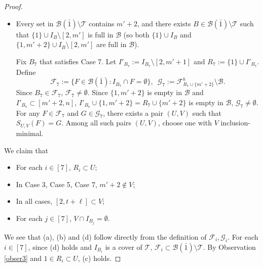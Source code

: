 \documentclass[11pt]{article}
\newcommand{\m}{\mathcal}
\begin{document}
\begin{proof}
\begin{itemize}
Fix $B_6$ that satisfies Case 6. 
Let $I'_{B_6}:=I_{B_6}\setminus [2,m']$ and $R_6:=\{1\}\cup I'_{B_6}$.
Define
\begin{equation*}
    \m F_6:=\{F\in \m B(\bar1): I_{B_6}\cap F=\emptyset\}, \,\,\,
    \m G_6:=\m F_{R_6}^b\setminus \m B.
\end{equation*}
Since $B_6\in \m F_6$, $\m F_6\ne \emptyset$. Since $R_6$ is non-full in $\m B$, $\m G_6\ne \emptyset$. 
For any $F\in \m F_6$ and $G\in \m G_6$, there exists a pair $(U,V)$ such that $S_{U,V}(F)=G$. Among all such pairs $(U,V)$, choose one with $V$ inclusion-minimal.

\item[Case 7.] Every set in $\m B(\bar{1})\setminus \m T$ contains $m'+2$, and there exists $B\in \m B(\bar{1})\setminus \m T$ such that $\{1\}\cup I_{B}\setminus [2,m']$ is full in $\m B$ (so both $\{1\}\cup I_{B}$ and 
$\{1,m'+2\}\cup I_{B}\setminus [2,m']$ are full in $\m B$). 

Fix $B_7$ that satisfies Case 7. 
Let $I'_{B_7}:=I_{B_7}\setminus [2,m'+1]$ and $R_7:=\{1\}\cup I'_{B_7}$.
Define
\begin{equation*}
    \m F_7:=\{F\in \m B(\bar1): I_{B_7}\cap F=\emptyset\}, \,\,\,
    \m G_7:=\m F_{R_7\cup \{m'+2\}}^b\setminus \m B.
\end{equation*}
Since $B_7\in \m F_7$, $\m F_7\ne \emptyset$. 
Since $\{1,m'+2\}$ is empty in $\m B$ and $I'_{B_7}\subset [m'+2, n]$, $I'_{B_7}\cup \{1, m'+2\}=R_7\cup \{m'+2\}$ is empty in $\m B$, $\m G_7\ne \emptyset$. 
For any $F\in \m F_7$ and $G\in \m G_7$, there exists a pair $(U,V)$ such that $S_{U,V}(F)=G$. Among all such pairs $(U,V)$, choose one with $V$ inclusion-minimal.
\end{itemize}




We claim that
\begin{itemize}
    \item[(a)] For each $i\in [7]$, $R_i\subset U$; 
    \item[(b)] In Case 3, Case 5, Case 7, $m'+2\not\in V$; 
    \item[(c)] In all cases, $[2,t+\ell]\subset V$;
    \item[(d)] For each $j\in [7]$, $V\cap I_{B_j}=\emptyset.$
\end{itemize}

We see that (a), (b) and (d)  follow directly from 
the definition of $\m F_i, \m G_i$. 
For each $i\in [7]$, since (d) holds and $I_{B_i}$ is a cover of $\m T$, $\m F_i\subset \m B(\bar 1)\setminus \m T$.
By Observation \ref{obser3} and $1\in R_i\subset U$, (c) holds. 


\end{proof}
\end{document}
